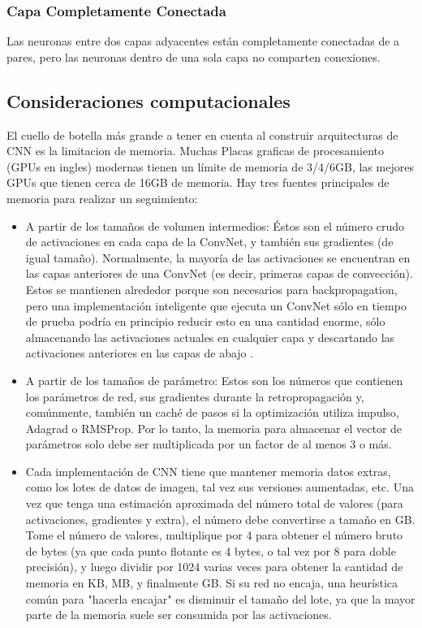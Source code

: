 \documentclass[a4paper,11pt,spanish]{book}
\begin{document}
      \subsubsection{Capa Completamente Conectada}
	Las neuronas entre dos capas adyacentes están completamente conectadas de a pares, pero las neuronas dentro de una sola capa no comparten conexiones.

    \subsection {Consideraciones computacionales}
      El cuello de botella más grande a tener en cuenta al construir arquitecturas de CNN es la limitacion de memoria.
      Muchas Placas graficas de procesamiento (GPUs en ingles) modernas tienen un límite de memoria de 3/4/6GB, las mejores GPUs que tienen cerca de 16GB de memoria.
      Hay tres fuentes principales de memoria para realizar un seguimiento:
      \begin{itemize}
	\item A partir de los tamaños de volumen intermedios: Éstos son el número crudo de activaciones en cada capa de la ConvNet, y también sus gradientes (de igual tamaño). Normalmente, la mayoría de las activaciones se encuentran en las capas anteriores de una ConvNet (es decir, primeras capas de convección). Estos se mantienen alrededor porque son necesarios para backpropagation, pero una implementación inteligente que ejecuta un ConvNet sólo en tiempo de prueba podría en principio reducir esto en una cantidad enorme, sólo almacenando las activaciones actuales en cualquier capa y descartando las activaciones anteriores en las capas de abajo .
	\item A partir de los tamaños de parámetro: Estos son los números que contienen los parámetros de red, sus gradientes durante la retropropagación y, comúnmente, también un caché de pasos si la optimización utiliza impulso, Adagrad o RMSProp. Por lo tanto, la memoria para almacenar el vector de parámetros solo debe ser multiplicada por un factor de al menos 3 o más.
	\item Cada implementación de CNN tiene que mantener memoria datos extras, como los lotes de datos de imagen, tal vez sus versiones aumentadas, etc.
	Una vez que tenga una estimación aproximada del número total de valores (para activaciones, gradientes y extra), el número debe convertirse a tamaño en GB. Tome el número de valores, multiplique por 4 para obtener el número bruto de bytes (ya que cada punto flotante es 4 bytes, o tal vez por 8 para doble precisión), y luego dividir por 1024 varias veces para obtener la cantidad de memoria en KB, MB, y finalmente GB. Si su red no encaja, una heurística común para "hacerla encajar" es disminuir el tamaño del lote, ya que la mayor parte de la memoria suele ser consumida por las activaciones.
      \end{itemize}
\end{document}
